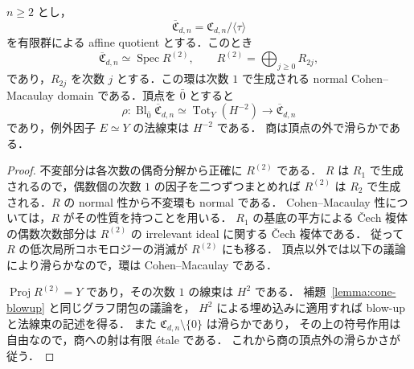 \begin{proposition}
\label{prop:sign-veronese-cone}
$n\geq2$ とし，
\[
 \overline{\mathfrak C}_{d,n}
 =\mathfrak C_{d,n}/\langle\tau\rangle
\]
を有限群による affine quotient とする．このとき
\[
 \overline{\mathfrak C}_{d,n}
 \simeq\operatorname{Spec}R^{(2)},\qquad
 R^{(2)}=\bigoplus_{j\geq0}R_{2j},
\]
であり，$R_{2j}$ を次数 $j$ とする．この環は次数 $1$ で生成される
normal Cohen--Macaulay domain である．頂点を $\bar0$ とすると
\[
 \rho:\operatorname{Bl}_{\bar0}\overline{\mathfrak C}_{d,n}
 \simeq\operatorname{Tot}_Y(H^{-2})
 \longrightarrow\overline{\mathfrak C}_{d,n}
\]
であり，例外因子 $E\simeq Y$ の法線束は $H^{-2}$ である．
商は頂点の外で滑らかである．
\end{proposition}
\begin{proof}
不変部分は各次数の偶奇分解から正確に $R^{(2)}$ である．
$R$ は $R_1$ で生成されるので，偶数個の次数 $1$ の因子を二つずつまとめれば
$R^{(2)}$ は $R_2$ で生成される．$R$ の normal 性から不変環も normal である．
Cohen--Macaulay 性については，$R$ がその性質を持つことを用いる．
$R_1$ の基底の平方による \v{C}ech 複体の偶数次数部分は
$R^{(2)}$ の irrelevant ideal に関する \v{C}ech 複体である．
従って $R$ の低次局所コホモロジーの消滅が $R^{(2)}$ にも移る．
頂点以外では以下の議論により滑らかなので，環は Cohen--Macaulay である．

$\operatorname{Proj}R^{(2)}=Y$ であり，その次数 $1$ の線束は $H^2$ である．
補題~\ref{lemma:cone-blowup} と同じグラフ閉包の議論を，
$H^2$ による埋め込みに適用すれば blow-up と法線束の記述を得る．
また $\mathfrak C_{d,n}\setminus\{0\}$ は滑らかであり，
その上の符号作用は自由なので，商への射は有限 \'{e}tale である．
これから商の頂点外の滑らかさが従う．
\end{proof}

